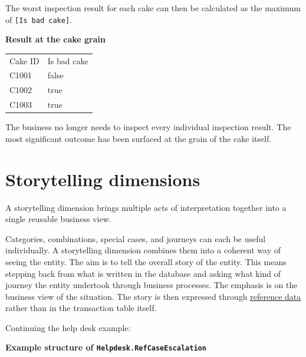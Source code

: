 \documentclass[10pt,openany,10pt]{book}
\newcounter{none}
\let\podeToprule\toprule
\let\podeMidrule\midrule
\let\podeBottomrule\bottomrule
\renewcommand{\toprule}{\arrayrulecolor{pbiGrid}\podeToprule}
\renewcommand{\midrule}{\arrayrulecolor{pbiGrid}\podeMidrule}
\renewcommand{\bottomrule}{\arrayrulecolor{pbiGrid}\podeBottomrule}
\begin{document}
The worst inspection result for each cake can then be calculated as the
maximum of \texttt{{[}Is\ bad\ cake{]}}.

\textbf{Result at the cake grain}

{\def\LTcaptype{none} %
\begin{longtable}[]{@{}ll@{}}
\toprule\noalign{}
Cake ID & Is bad cake \\
\midrule\noalign{}
\endhead
\bottomrule\noalign{}
\endlastfoot
C1001 & false \\
C1002 & true \\
C1003 & true \\
\end{longtable}
}

The business no longer needs to inspect every individual inspection
result. The most significant outcome has been surfaced at the grain of
the cake itself.

\section{Storytelling dimensions}\label{storytelling-dimensions}

A storytelling dimension brings multiple acts of interpretation together
into a single reusable business view.

Categories, combinations, special cases, and journeys can each be useful
individually. A storytelling dimension combines them into a coherent way
of seeing the entity. The aim is to tell the overall story of the
entity. This means stepping back from what is written in the database
and asking what kind of journey the entity undertook through business
processes. The emphasis is on the business view of the situation. The
story is then expressed through
\hyperref[docs-creating-information-reference-data]{reference data}
rather than in the transaction table itself.

Continuing the help desk example:

\textbf{Example structure of \texttt{Helpdesk.RefCaseEscalation}}
\end{document}
